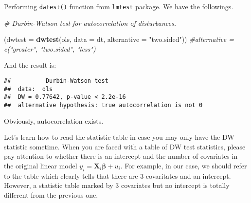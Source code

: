 \documentclass[
  12pt,
]{article}
\newenvironment{Shaded}{\begin{snugshade}}{\end{snugshade}}
\newcommand{\CommentTok}[1]{\textcolor[rgb]{0.56,0.35,0.01}{\textit{#1}}}
\newcommand{\DataTypeTok}[1]{\textcolor[rgb]{0.13,0.29,0.53}{#1}}
\newcommand{\KeywordTok}[1]{\textcolor[rgb]{0.13,0.29,0.53}{\textbf{#1}}}
\newcommand{\NormalTok}[1]{#1}
\newcommand{\StringTok}[1]{\textcolor[rgb]{0.31,0.60,0.02}{#1}}
\begin{document}
Performing \texttt{dwtest()} function from \texttt{lmtest} package. We have the followings.

\begin{Shaded}
\begin{Highlighting}[]
\CommentTok{\# Durbin{-}Watson test for autocorrelation of disturbances.}
    
\NormalTok{(}\DataTypeTok{dwtest =} \KeywordTok{dwtest}\NormalTok{(ols, }\DataTypeTok{data =}\NormalTok{ dt, }\DataTypeTok{alternative =} \StringTok{"two.sided"}\NormalTok{)) }\CommentTok{\#alternative = c("greater", "two.sided", "less")}
\end{Highlighting}
\end{Shaded}

And the result is:

\begin{verbatim}
##          Durbin-Watson test
##  data:  ols
##  DW = 0.77642, p-value < 2.2e-16
##  alternative hypothesis: true autocorrelation is not 0
\end{verbatim}

Obviously, autocorrelation exists.

Let's learn how to read the statistic table in case you may only have the DW statistic sometime. When you are faced with a table of DW test statistics, please pay attention to whether there is an intercept and the number of covariates in the original linear model \(y_i = \mathbf{X}_i \mathbf{\beta} + u_i\). For example, in our case, we should refer to the table which clearly tells that there are 3 covaritates and an intercept. However, a statistic table marked by 3 covariates but no intercept is totally different from the previous one.
\end{document}
